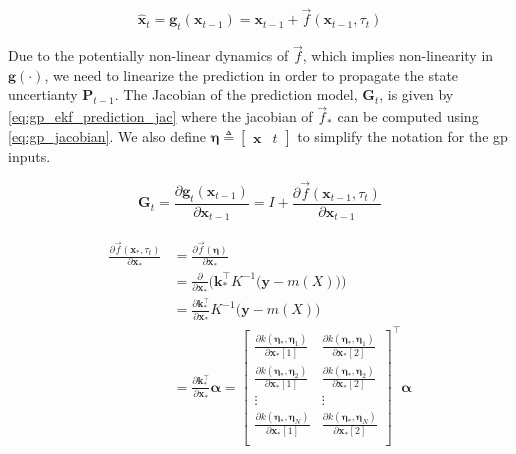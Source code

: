 \begin{equation}\label{eq:gp_ekf_prediction}
    \hat{\boldsymbol{x}}_{t} = \boldsymbol{g}_t(\boldsymbol{x}_{t-1}) = \boldsymbol{x}_{t-1} + \vec{f}(\boldsymbol{x}_{t-1}, \tau_t)
\end{equation}

Due to the potentially non-linear dynamics of $\vec{f}$, which implies non-linearity in $\boldsymbol{g}(\cdot)$, we need to linearize the prediction in order to propagate the state uncertianty $\boldsymbol{P}_{t-1}$. The Jacobian of the prediction model, $\boldsymbol{G}_t$, is given by \cref{eq:gp_ekf_prediction_jac} where the jacobian of $\vec{f}_*$ can be computed using \cref{eq:gp_jacobian}. We also define $\boldsymbol{\eta} \triangleq \begin{bmatrix}
        \boldsymbol{x} & t
    \end{bmatrix}$ to simplify the notation for the \acrshort{gp} inputs.

\begin{equation}\label{eq:gp_ekf_prediction_jac}
    \boldsymbol{G}_t = \frac{\partial \boldsymbol{g}_t(\boldsymbol{x}_{t-1})}{\partial \boldsymbol{x}_{t-1}} = I + \frac{\partial \vec{f}(\boldsymbol{x}_{t-1}, \tau_t)}{\partial \boldsymbol{x}_{t-1}}
\end{equation}

\begin{align}\label{eq:gp_jacobian}
    \begin{split}
        \frac{\partial \vec{f}(\boldsymbol{x}_*, \tau_t)}{\partial \boldsymbol{x}_*} &= \frac{\partial \vec{f}(\boldsymbol{\eta})}{\partial \boldsymbol{x}_*} \\  &= \frac{\partial}{\partial \boldsymbol{x}_*} \bigg(\boldsymbol{k}_*^\intercal K^{-1} \big(\boldsymbol{y} - m(X)\big)\bigg)\\
        &= \frac{\partial \boldsymbol{k}_*^\intercal}{\partial \boldsymbol{x}_*} K^{-1} \big(\boldsymbol{y} - m(X)\big)\\
        &= \frac{\partial \boldsymbol{k}_*^\intercal}{\partial \boldsymbol{x}_*} \boldsymbol{\alpha} = \begin{bmatrix}
            \frac{\partial k(\boldsymbol{\eta}_*, \boldsymbol{\eta}_1)}{\partial \boldsymbol{x}_*[1]} & \frac{\partial k(\boldsymbol{\eta}_*, \boldsymbol{\eta}_1)}{\partial \boldsymbol{x}_*[2]} \\
            \frac{\partial k(\boldsymbol{\eta}_*, \boldsymbol{\eta}_2)}{\partial \boldsymbol{x}_*[1]} & \frac{\partial k(\boldsymbol{\eta}_*, \boldsymbol{\eta}_2)}{\partial \boldsymbol{x}_*[2]} \\
            \vdots                                                                                    & \vdots                                                                                    \\
            \frac{\partial k(\boldsymbol{\eta}_*, \boldsymbol{\eta}_N)}{\partial \boldsymbol{x}_*[1]} & \frac{\partial k(\boldsymbol{\eta}_*, \boldsymbol{\eta}_N)}{\partial \boldsymbol{x}_*[2]} \\
        \end{bmatrix}^\intercal \boldsymbol{\alpha}
    \end{split}
\end{align}

